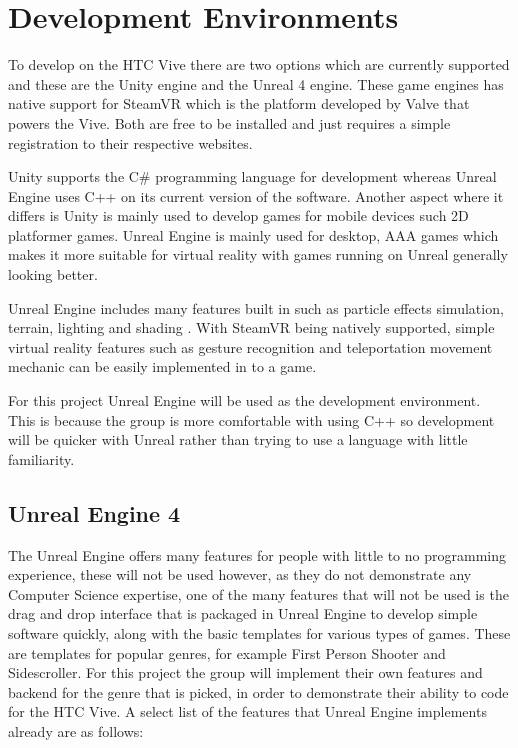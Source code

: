 
\section{Development Environments}
To develop on the HTC Vive there are two options which are currently supported and these are the Unity engine and the Unreal 4 engine. These game engines has native support for SteamVR which is the platform developed by Valve that powers the Vive. Both are free to be installed and just requires a simple registration to their respective websites.

Unity supports the C\# programming language for development whereas Unreal Engine uses C++ on its current version of the software. Another aspect where it differs is Unity is mainly used to develop games for mobile devices such 2D platformer games. Unreal Engine is mainly used for desktop, AAA games which makes it more suitable for virtual reality with games running on Unreal generally looking better.

Unreal Engine includes many features built in such as particle effects simulation, terrain, lighting and shading \cite{unrealfeatures}. With SteamVR being natively supported, simple virtual reality features such as gesture recognition and teleportation movement mechanic can be easily implemented in to a game.

For this project Unreal Engine will be used as the development environment. This is because the group is more comfortable with using C++ so development will be quicker with Unreal rather than trying to use a language with little familiarity.

\subsection{Unreal Engine 4}
The Unreal Engine offers many features for people with little to no programming experience, these will not be used however, as they do not demonstrate any Computer Science expertise, one of the many features that will not be used is the drag and drop interface that is packaged in Unreal Engine to develop simple software quickly, along with the basic templates for various types of games. These are templates for popular genres, for example First Person Shooter and Sidescroller. For this project the group will implement their own features and backend for the genre that is picked, in order to demonstrate their ability to code for the HTC Vive. A select list of the features that Unreal Engine implements already are as follows:

